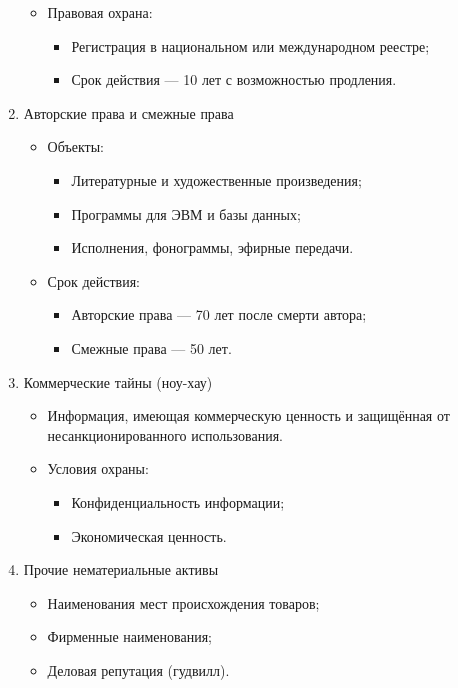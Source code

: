 \begin{enumerate}
\begin{itemize}
            \item Правовая охрана:
            \begin{itemize}
                \item Регистрация в национальном или международном реестре;
                \item Срок действия — 10 лет с возможностью продления.
            \end{itemize}
        \end{itemize}
    \item Авторские права и смежные права
        \begin{itemize}
            \item Объекты:
            \begin{itemize}
                \item Литературные и художественные произведения;
                \item Программы для ЭВМ и базы данных;
                \item Исполнения, фонограммы, эфирные передачи.
            \end{itemize}
            \item Срок действия:
            \begin{itemize}
                \item Авторские права — 70 лет после смерти автора;
                \item Смежные права — 50 лет.
            \end{itemize}
        \end{itemize}
    \item Коммерческие тайны (ноу-хау)
        \begin{itemize}
            \item Информация, имеющая коммерческую ценность и защищённая от несанкционированного использования.
            \item Условия охраны:
            \begin{itemize}
                \item Конфиденциальность информации;
                \item Экономическая ценность.
            \end{itemize}
        \end{itemize}
    \item Прочие нематериальные активы
        \begin{itemize}
            \item Наименования мест происхождения товаров;
            \item Фирменные наименования;
            \item Деловая репутация (гудвилл).
        \end{itemize}
\end{enumerate}

